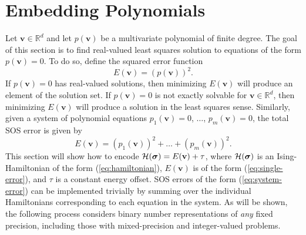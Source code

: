 \section{Embedding Polynomials}

Let $\mathbf{v}\in\mathbb{R}^d$ and let $p(\mathbf{v})$ be a multivariate polynomial of finite degree.
The goal of this section is to find real-valued least squares solution to equations of the form $p(\mathbf{v}) = 0$.
To do so, define the squared error function
\begin{equation}
E(\mathbf{v}) = \left( p(\mathbf{v}) \right)^2.
\label{eq:single-error}
\end{equation}
If $p(\mathbf{v}) = 0$ has real-valued solutions, then minimizing $E(\mathbf{v})$ will produce an element of the solution set.
If $p(\mathbf{v}) = 0$ is not exactly solvable for $\mathbf{v}\in\mathbb{R}^d$, then minimizing $E(\mathbf{v})$ will produce a solution in the least squares sense.
Similarly, given a system of polynomial equations $p_1(\mathbf{v})=0$, $\ldots$, $p_m(\mathbf{v})=0$, the total SOS error is given by
\begin{equation}
E(\mathbf{v}) = \left(p_1(\mathbf{v})\right)^2 + \ldots + \left(p_m(\mathbf{v})\right)^2.
\label{eq:system-error}  
\end{equation}
This section will show how to encode $\mathcal{H}(\text{\boldmath$\sigma$}) = E(\mathbf{v}) + \tau$, where $\mathcal{H}(\text{\boldmath$\sigma$})$ is an Ising-Hamiltonian of the form (\ref{eq:hamiltonian}), $E(\mathbf{v})$ is of the form (\ref{eq:single-error}), and $\tau$ is a constant energy offset.
SOS errors of the form (\ref{eq:system-error}) can be implemented trivially by summing over the individual Hamiltonians corresponding to each equation in the system.
As will be shown, the following process considers binary number representations of \textit{any} fixed precision, including those with mixed-precision and integer-valued problems.

